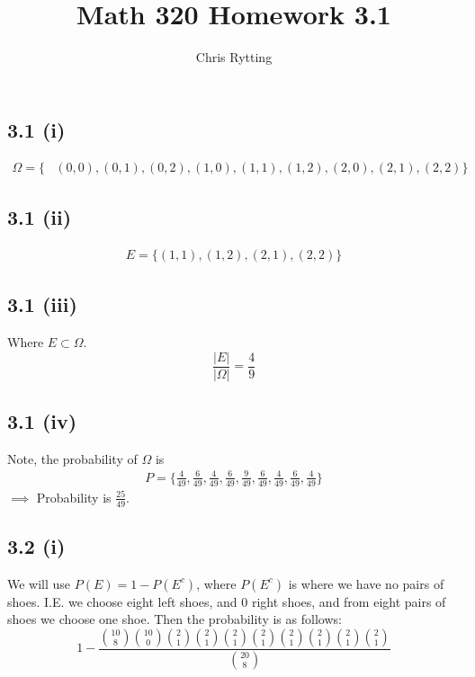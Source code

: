 \documentclass[letterpaper,12pt]{article}
\theoremstyle{definition}
\begin{document}
\title{Math 320 Homework 3.1}
\author{Chris Rytting}
\maketitle

\subsection*{3.1 (i)}

\begin{align*}
    \Omega = \{&(0,0), (0,1), (0,2),
               (1,0), (1,1), (1,2),
           (2,0), (2,1), (2,2)\}
\end{align*}
\subsection*{3.1 (ii)}
\begin{align*}
    E = \{(1,1), (1,2), (2,1), (2,2)\}
\end{align*}
\subsection*{3.1 (iii)}

Where $E \subset \Omega$.\\

\[\frac{|E|}{|\Omega|} = \frac{4}{9}\]

\subsection*{3.1 (iv)}

Note, the probability of $\Omega$ is
\begin{align*}
    P = \{\frac{4}{49}, \frac{6}{49}, \frac{4}{49}, 
           \frac{6}{49}, \frac{9}{49}, \frac{6}{49}, 
          \frac{4}{49}, \frac{6}{49}, \frac{4}{49}\}
\end{align*}
$\implies $ Probability is $\frac{25}{49}$.


\subsection*{3.2 (i)}
We will use $P(E) = 1 - P(E^c)$, where $P(E^c)$ is where we have no pairs of shoes. I.E. we choose eight left shoes, and $0$ right shoes, and from eight pairs of shoes we choose one shoe. Then the probability is as follows:
\[  1 - \frac{\binom{10}{8} \binom{10}{0} \binom21 \binom21 \binom21 \binom21 \binom21 \binom21 \binom21 \binom21   }{\binom{20}{8}}  \]
\end{document}
